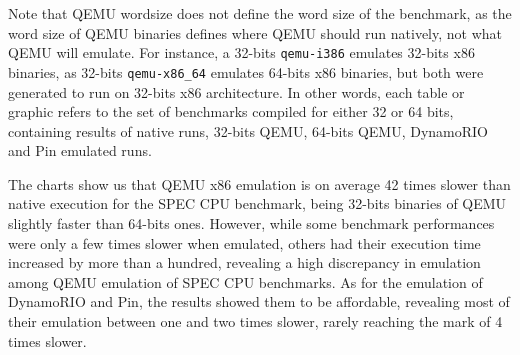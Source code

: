 \documentclass[11pt,twoside]{article}
\begin{document}
  Note that QEMU wordsize does not define the word size of the
  benchmark, as the word size of QEMU binaries defines
  where QEMU should run
  natively, not what QEMU will emulate.
  For instance, a 32-bits \texttt{qemu-i386}
  emulates 32-bits x86 binaries, as 32-bits \texttt{qemu-x86\_64} 
  emulates 64-bits x86 binaries, but both were generated to run
  on 32-bits x86 architecture. In other words, each table or
  graphic refers to the set of benchmarks compiled for either
  32 or 64 bits, containing results of native runs, 32-bits
  QEMU, 64-bits QEMU, DynamoRIO and Pin emulated runs.

  The charts show us that QEMU x86 emulation is on average
  42 times slower than native execution for the
  SPEC CPU benchmark, being 32-bits binaries of QEMU slightly
  faster than 64-bits ones.
  However, while some benchmark performances were only a few
  times slower when emulated, others had their execution
  time increased by more than a hundred, revealing a high
  discrepancy in emulation among QEMU emulation of
  SPEC CPU benchmarks.
  As for the emulation of DynamoRIO and Pin,
  the results showed them to be affordable, revealing
  most of their emulation between one and
  two times slower, rarely reaching the mark
  of 4 times slower.
\end{document}
